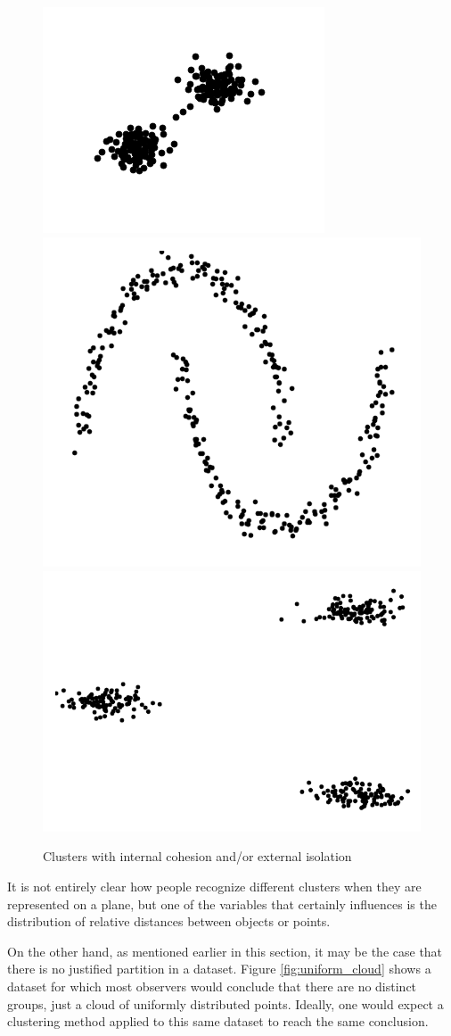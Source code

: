 \begin{figure}[bth]
	\myfloatalign
	{\includegraphics[width=.3\linewidth]{gfx/Clustering/TwoBasicsClusters}}
	{\includegraphics[width=.3\linewidth]{gfx/Clustering/MoonsBasics}}
	{\includegraphics[width=.3\linewidth]{gfx/Clustering/ThreeBasicClusters}}
	\caption[Clusters with internal cohesion and/or external isolation]{Clusters with internal cohesion and/or external isolation}\label{fig:ClustersProperties}
\end{figure}

It is not entirely clear how people recognize different clusters when they are represented on a plane, but one of the variables that certainly influences is the distribution of relative distances between objects or points.

On the other hand, as mentioned earlier in this section, it may be the case that there is no justified partition in a dataset. Figure \ref{fig:uniform_cloud} shows a dataset for which most observers would conclude that there are no distinct groups, just a cloud of uniformly distributed points. Ideally, one would expect a clustering method applied to this same dataset to reach the same conclusion.

